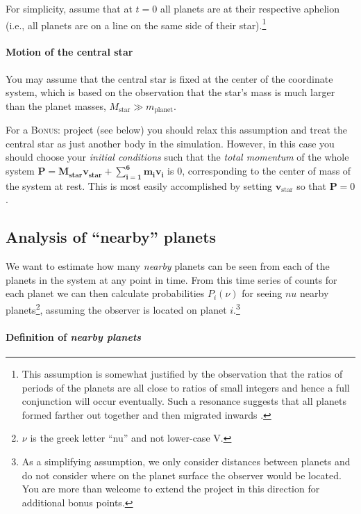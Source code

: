 \documentclass[letterpaper]{scrartcl}
\newcommand{\BONUS}{\textsc{Bonus: }}
\renewcommand{\vec}[1]{\ensuremath{\mathbf{#1}}}
\begin{document}
For simplicity, assume that at $t=0$ all planets are at their
respective aphelion (i.e., all planets are on a line on the same side
of their star).\footnote{This assumption is somewhat justified by
  the observation that the ratios of periods of the planets are all
  close to ratios of small integers and hence a full conjunction will
  occur eventually. Such a resonance suggests that all planets formed
  farther out together and then migrated inwards
  \citep{Gillon:2017aa}.}

\paragraph{Motion of the central star}

You may assume that the central star is fixed at the center of the
coordinate system, which is based on the observation that the star's
mass is much larger than the planet masses, $M_{\text{star}} \gg
m_{\text{planet}}$. 

For a \BONUS project (see below) you should relax this assumption and
treat the central star as just another body in the
simulation. However, in this case you should choose your \emph{initial
  conditions} such that the \emph{total momentum} of the whole system
$\vec{P = M_{\text{star}}\vec{v}_{\text{star}} + \sum_{i=1}^{6}m_{i}
  \vec{v}_{i}}$
is 0, corresponding to the center of mass of the system at rest. This
is most easily accomplished by setting $\vec{v}_{\text{star}}$ so that
$\vec{P}=0$.

\subsection{Analysis of ``nearby'' planets}
\label{sec:nearby}

We want to estimate how many \emph{nearby} planets can be seen from
each of the planets in the system at any point in time. From this time
series of counts for each planet we can then calculate probabilities
$P_{i}(\nu)$ for seeing $nu$ nearby planets\footnote{$\nu$ is the
  greek letter ``nu'' and not lower-case V.}, assuming the observer is
located on planet $i$.\footnote{As a simplifying assumption, we only
  consider distances between planets and do not consider where on the
  planet surface the observer would be located. You are more than
  welcome to extend the project in this direction for additional bonus
  points.}

\paragraph{Definition of \emph{nearby planets}}
\end{document}
